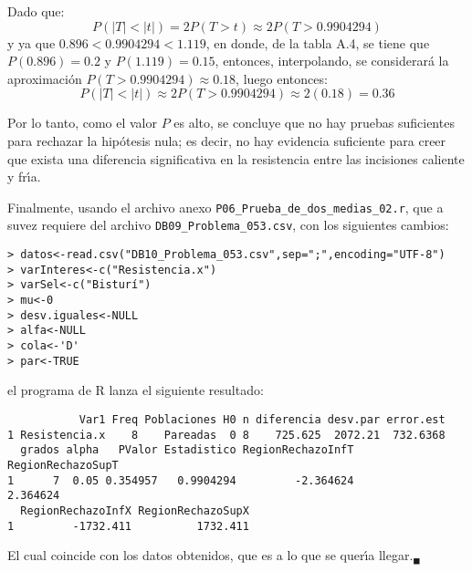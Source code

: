 \begin{solucion}
\begin{enumerate}
  \begin{valorp}
   Dado que:
   \begin{equation*}
    P(|T| < |t|) = 2P(T > t) \approx 2P(T > 0.9904294)
   \end{equation*}
   y ya que $0.896 < 0.9904294 < 1.119$, en donde, de la tabla A.4, se tiene que
   $P(0.896) = 0.2$ y $P(1.119) = 0.15$, entonces, interpolando,
   se considerar\'a la aproximaci\'on $P(T > 0.9904294) \approx 0.18$,
   luego entonces:
   \begin{equation*}
    P(|T| < |t|) \approx 2P(T > 0.9904294) \approx 2(0.18) = 0.36
   \end{equation*}
  \end{valorp}

  \begin{conclusion}
   Por lo tanto, como el valor $P$ es alto, se concluye
   que no hay pruebas suficientes para rechazar la hip\'otesis nula;
   es decir, no hay evidencia suficiente para creer que exista una diferencia
   significativa en la resistencia entre las incisiones caliente y fr\'{\i}a.
  \end{conclusion}
  Finalmente, usando el archivo anexo \texttt{P06\_Prueba\_de\_dos\_medias\_02.r},
  que a suvez requiere del archivo \texttt{DB09\_Problema\_053.csv},
  con los siguientes cambios:
  \begin{verbatim}
> datos<-read.csv("DB10_Problema_053.csv",sep=";",encoding="UTF-8")
> varInteres<-c("Resistencia.x")
> varSel<-c("Bisturí")
> mu<-0
> desv.iguales<-NULL
> alfa<-NULL
> cola<-'D'
> par<-TRUE
  \end{verbatim}
  \vspace{-0.5cm}
  el programa de R lanza el siguiente resultado:
  \begin{verbatim}
           Var1 Freq Poblaciones H0 n diferencia desv.par error.est
1 Resistencia.x    8    Pareadas  0 8    725.625  2072.21  732.6368
  grados alpha   PValor Estadistico RegionRechazoInfT RegionRechazoSupT
1      7  0.05 0.354957   0.9904294         -2.364624          2.364624
  RegionRechazoInfX RegionRechazoSupX
1         -1732.411          1732.411
  \end{verbatim}
  El cual coincide con los datos obtenidos,
  que es a lo que se quer\'{\i}a llegar.${}_{\blacksquare}$
 \end{enumerate}
\end{solucion}
